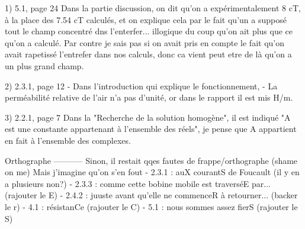 
1) 5.1, page 24
Dans la partie discussion, on dit qu'on a expérimentalement 8 cT, à la place des 7.54 cT calculés, et on explique 
cela par le fait qu'un a supposé tout le champ concentré dns l'enterfer... illogique du coup qu'on ait plus que ce qu'on a calculé.
Par contre je sais pas si on avait pris en compte le fait qu'on avait rapetissé l'entrefer dans nos calculs, donc ca vient peut
etre de là qu'on a un plus grand champ.

2) 2.3.1, page 12
- Dans l'introduction qui explique le fonctionnement, 
- La perméabilité relative de l'air n'a pas d'unité, or dans le rapport il est mis H/m.

3) 2.2.1, page 7
Dans la "Recherche de la solution homogène", il est indiqué "A est une constante appartenant
à l'ensemble des réels", je pense que A appartient en fait à l'ensemble des complexes.

Orthographe
-----------
Sinon, il restait qqes fautes de frappe/orthographe (shame on me) Mais j'imagine qu'on s'en fout
- 2.3.1 : auX courantS de Foucault (il y en a plusieurs non?)
- 2.3.3 : comme cette bobine mobile est traverséE par... (rajouter le E)
- 2.4.2 : juuste avant qu'elle ne commenceR à retourner... (backer le r)
- 4.1 : résistanCe (rajouter le C)
- 5.1 : nous sommes assez fierS (rajouter le S)

